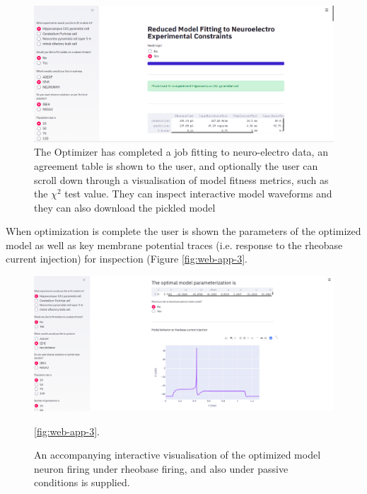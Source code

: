 \begin{figure}
\begin{center}
\includegraphics[scale=1]{chapters/app_tex/app_results}
\end{center}
\caption[Web application (2)]{The Optimizer has completed a job fitting to neuro-electro data,  an agreement table is shown to the user, and optionally the user can scroll down through a visualisation of model fitness metrics, such as the $\chi^{2}$ test value. They can inspect interactive model waveforms and they can also download the pickled model}
\label{fig:web-app-2}
\end{figure}

When optimization is complete the user is shown the parameters of the optimized model as well as key membrane potential traces (i.e. response to the rheobase current injection) for inspection (Figure \ref{fig:web-app-3}.

\begin{figure}
\begin{center}
\includegraphics[scale=1]{chapters/app_tex/more_app_results}
\end{center}
\caption[Web application (3)]{An accompanying interactive visualisation of the optimized model neuron firing under rheobase firing, and also under passive conditions is supplied.}
\ref{fig:web-app-3}.
\end{figure}

